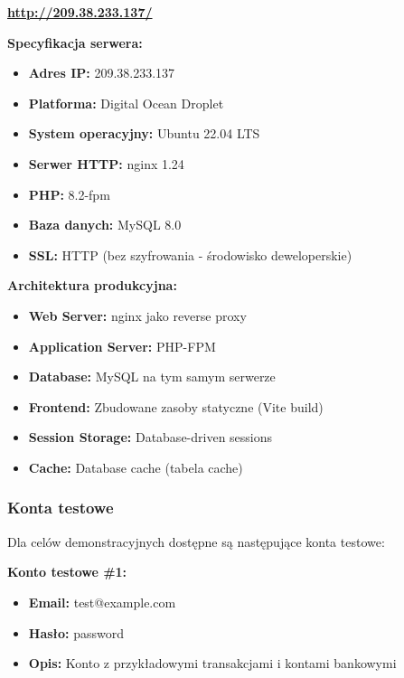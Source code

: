 \documentclass[12pt,a4paper]{article}
\begin{document}
    \begin{center}
        \textbf{\Large \url{http://209.38.233.137/}}
    \end{center}

    \textbf{Specyfikacja serwera:}
    \begin{itemize}
        \item \textbf{Adres IP:} 209.38.233.137
        \item \textbf{Platforma:} Digital Ocean Droplet
        \item \textbf{System operacyjny:} Ubuntu 22.04 LTS
        \item \textbf{Serwer HTTP:} nginx 1.24
        \item \textbf{PHP:} 8.2-fpm
        \item \textbf{Baza danych:} MySQL 8.0
        \item \textbf{SSL:} HTTP (bez szyfrowania - środowisko deweloperskie)
    \end{itemize}

    \textbf{Architektura produkcyjna:}
    \begin{itemize}
        \item \textbf{Web Server:} nginx jako reverse proxy
        \item \textbf{Application Server:} PHP-FPM
        \item \textbf{Database:} MySQL na tym samym serwerze
        \item \textbf{Frontend:} Zbudowane zasoby statyczne (Vite build)
        \item \textbf{Session Storage:} Database-driven sessions
        \item \textbf{Cache:} Database cache (tabela cache)
    \end{itemize}

    \subsubsection{Konta testowe}

    Dla celów demonstracyjnych dostępne są następujące konta testowe:

    \textbf{Konto testowe \#1:}
    \begin{itemize}
        \item \textbf{Email:} test@example.com
        \item \textbf{Hasło:} password
        \item \textbf{Opis:} Konto z przykładowymi transakcjami i kontami bankowymi
    \end{itemize}
\end{document}
